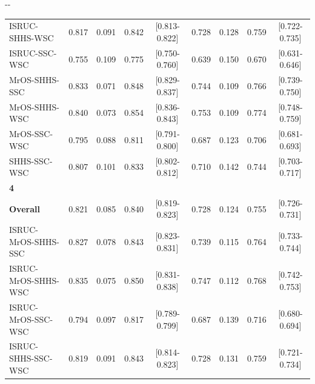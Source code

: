 \begin{table}
\begin{adjustwidth*}{}{-\marginparwidth-\marginparsep}
\begin{threeparttable}
\begin{tabular}{@{}lcccccccc@{}}
\acs{ISRUC}-\acs{SHHS}-\acs{WSC}            & 0.817         & 0.091       & 0.842           & [0.813-0.822]         & 0.728         & 0.128       & 0.759           & [0.722-0.735]         \\
\acs{ISRUC}-\acs{SSC}-\acs{WSC}             & 0.755         & 0.109       & 0.775           & [0.750-0.760]         & 0.639         & 0.150       & 0.670           & [0.631-0.646]         \\
\acs{MrOS}-\acs{SHHS}-\acs{SSC}             & 0.833         & 0.071       & 0.848           & [0.829-0.837]         & 0.744         & 0.109       & 0.766           & [0.739-0.750]         \\
\acs{MrOS}-\acs{SHHS}-\acs{WSC}             & 0.840         & 0.073       & 0.854           & [0.836-0.843]         & 0.753         & 0.109       & 0.774           & [0.748-0.759]         \\
\acs{MrOS}-\acs{SSC}-\acs{WSC}              & 0.795         & 0.088       & 0.811           & [0.791-0.800]         & 0.687         & 0.123       & 0.706           & [0.681-0.693]         \\
\acs{SHHS}-\acs{SSC}-\acs{WSC}              & 0.807         & 0.101       & 0.833           & [0.802-0.812]         & 0.710         & 0.142       & 0.744           & [0.703-0.717]         \\
\textbf{4}                &               &             &                 &                       &               &             &                 &                       \\
\textbf{Overall}          & 0.821         & 0.085       & 0.840           & [0.819-0.823]         & 0.728         & 0.124       & 0.755           & [0.726-0.731]         \\
\acs{ISRUC}-\acs{MrOS}-\acs{SHHS}-\acs{SSC}       & 0.827         & 0.078       & 0.843           & [0.823-0.831]         & 0.739         & 0.115       & 0.764           & [0.733-0.744]         \\
\acs{ISRUC}-\acs{MrOS}-\acs{SHHS}-\acs{WSC}       & 0.835         & 0.075       & 0.850           & [0.831-0.838]         & 0.747         & 0.112       & 0.768           & [0.742-0.753]         \\
\acs{ISRUC}-\acs{MrOS}-\acs{SSC}-\acs{WSC}        & 0.794         & 0.097       & 0.817           & [0.789-0.799]         & 0.687         & 0.139       & 0.716           & [0.680-0.694]         \\
\acs{ISRUC}-\acs{SHHS}-\acs{SSC}-\acs{WSC}        & 0.819         & 0.091       & 0.843           & [0.814-0.823]         & 0.728         & 0.131       & 0.759           & [0.721-0.734]         \\

\end{tabular}
\end{threeparttable}
\end{adjustwidth*}
\end{table}
